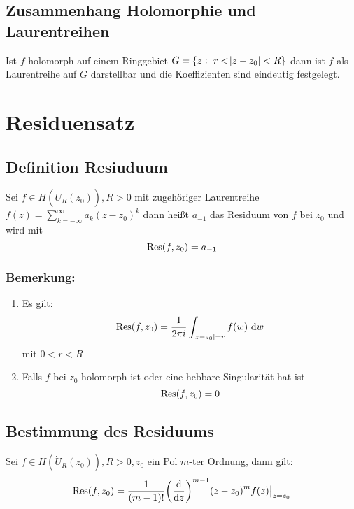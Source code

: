 \subsection{Zusammenhang Holomorphie und Laurentreihen}
Ist $f$ holomorph auf einem Ringgebiet $G = \{z:\ r < \abs{z-z_0} < R\}$ dann ist $f$ als Laurentreihe auf $G$
darstellbar und die Koeffizienten sind eindeutig festgelegt.

\section{Residuensatz}
\subsection{Definition Resiuduum}
Sei $f \in H(\dot{U}_R(z_0)), R>0$ mit zugehöriger Laurentreihe 
$f(z) = \sum_{k=-\infty}^\infty a_k {(z-z_0)}^k$ dann
heißt $a_{-1}$ das Residuum von $f$ bei $z_0$ und wird mit
\begin{equation*}
    \operatorname{Res}(f, z_0) = a_{-1} 
\end{equation*}
\subsubsection{Bemerkung:}
\begin{enumerate}
    \item Es gilt: 
        \begin{equation*}
            \operatorname{Res}(f,z_0) = \frac{1}{2\pi i} 
            \int_{\abs{z-z_0} = r} f(w) \text{ d}w
        \end{equation*}
        mit $0 < r < R$
    \item Falls $f$ bei $z_0$ holomorph ist oder eine
        hebbare Singularität hat ist
        \begin{equation*}
            \operatorname{Res}(f, z_0) = 0 
        \end{equation*}
\end{enumerate}

\subsection{Bestimmung des Residuums}
Sei $f \in H(\dot{U}_R (z_0)), R > 0, z_0$ ein Pol
$m$-ter Ordnung, dann gilt:
\begin{equation*}
    \operatorname{Res}(f, z_0) = \frac{1}{(m-1)!} 
    {\left( \frac{\text{d}}{\text{d}z} \right)}^{m-1}
    {(z-z_0)}^m f(z) \big|_{z=z_0}
\end{equation*}

